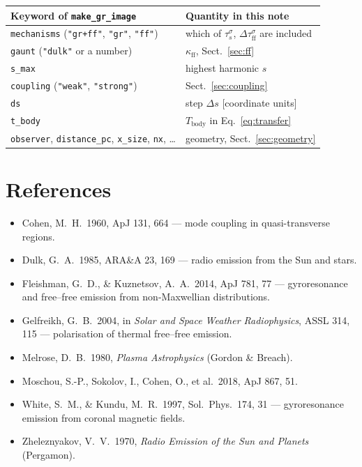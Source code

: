 \documentclass[11pt,a4paper]{article}
\newcommand{\code}[1]{\texttt{#1}}
\begin{document}
\begin{center}
\small
\begin{tabular}{@{}l l@{}}
\toprule
Keyword of \code{make\_gr\_image} & Quantity in this note \\
\midrule
\code{mechanisms} (\code{"gr+ff"}, \code{"gr"}, \code{"ff"}) & which of $\tau_s^\sigma$, $\Delta\tau_\text{ff}^\sigma$ are included \\
\code{gaunt} (\code{"dulk"} or a number) & $\kappa_\text{ff}$, Sect.~\ref{sec:ff} \\
\code{s\_max} & highest harmonic $s$ \\
\code{coupling} (\code{"weak"}, \code{"strong"}) & Sect.~\ref{sec:coupling} \\
\code{ds} & step $\Delta s$ [coordinate units] \\
\code{t\_body} & $T_\text{body}$ in Eq.~\eqref{eq:transfer} \\
\code{observer}, \code{distance\_pc}, \code{x\_size}, \code{nx}, \ldots & geometry, Sect.~\ref{sec:geometry} \\
\bottomrule
\end{tabular}
\end{center}

\section*{References}
\begin{small}
\begin{itemize}[leftmargin=1.2em,itemsep=1pt]
\item Cohen, M.\ H.\ 1960, ApJ 131, 664 --- mode coupling in quasi-transverse regions.
\item Dulk, G.\ A.\ 1985, ARA\&A 23, 169 --- radio emission from the Sun and stars.
\item Fleishman, G.\ D., \& Kuznetsov, A.\ A.\ 2014, ApJ 781, 77 --- gyroresonance and free--free
      emission from non-Maxwellian distributions.
\item Gelfreikh, G.\ B.\ 2004, in \emph{Solar and Space Weather Radiophysics}, ASSL 314, 115 ---
      polarisation of thermal free--free emission.
\item Melrose, D.\ B.\ 1980, \emph{Plasma Astrophysics} (Gordon \& Breach).
\item Moschou, S.-P., Sokolov, I., Cohen, O., et al.\ 2018, ApJ 867, 51.
\item White, S.\ M., \& Kundu, M.\ R.\ 1997, Sol.\ Phys.\ 174, 31 --- gyroresonance emission from
      coronal magnetic fields.
\item Zheleznyakov, V.\ V.\ 1970, \emph{Radio Emission of the Sun and Planets} (Pergamon).
\end{itemize}
\end{small}
\end{document}
